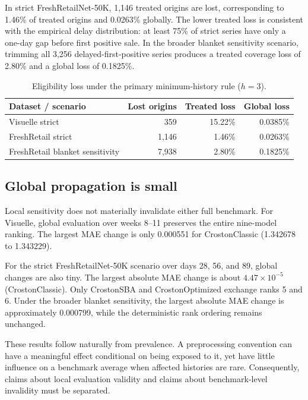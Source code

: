 In strict FreshRetailNet-50K, 1,146 treated origins are lost, corresponding to 1.46\% of treated origins and 0.0263\% globally. The lower treated loss is consistent with the empirical delay distribution: at least 75\% of strict series have only a one-day gap before first positive sale. In the broader blanket sensitivity scenario, trimming all 3,256 delayed-first-positive series produces a treated coverage loss of 2.80\% and a global loss of 0.1825\%.

\begin{table}[t]
\centering
\caption{Eligibility loss under the primary minimum-history rule ($h=3$).}
\label{tab:coverage}
\small
\begin{tabular}{lrrr}
\toprule
Dataset / scenario & Lost origins & Treated loss & Global loss \\
\midrule
Visuelle strict & 359 & 15.22\% & 0.0385\% \\
FreshRetail strict & 1,146 & 1.46\% & 0.0263\% \\
FreshRetail blanket sensitivity & 7,938 & 2.80\% & 0.1825\% \\
\bottomrule
\end{tabular}
\end{table}

\subsection{Global propagation is small}

Local sensitivity does not materially invalidate either full benchmark. For Visuelle, global evaluation over weeks 8--11 preserves the entire nine-model ranking. The largest MAE change is only 0.000551 for CrostonClassic (1.342678 to 1.343229).

For the strict FreshRetailNet-50K scenario over days 28, 56, and 89, global changes are also tiny. The largest absolute MAE change is about $4.47\times10^{-5}$ (CrostonClassic). Only CrostonSBA and CrostonOptimized exchange ranks 5 and 6. Under the broader blanket sensitivity, the largest absolute MAE change is approximately 0.000799, while the deterministic rank ordering remains unchanged.

These results follow naturally from prevalence. A preprocessing convention can have a meaningful effect conditional on being exposed to it, yet have little influence on a benchmark average when affected histories are rare. Consequently, claims about local evaluation validity and claims about benchmark-level invalidity must be separated.

